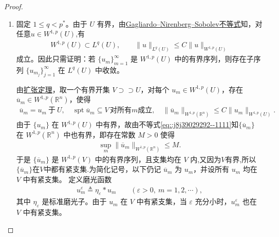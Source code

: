\documentclass[../../main.tex]{subfiles}
\begin{document}
\begin{proof}
\begin{enumerate}[(1)]
\item 固定 $1\leqslant q<p^{*}$。由于 $U$ 有界，由\hyperref[theorem:Gagliardo--Nirenberg--Sobolev不等式]{Gagliardo--Nirenberg--Sobolev不等式}知，对任意$u\in W^{1,p}(U)$,有
\begin{align}\label{eq::rellich-continuous}
W^{1,p}(U)\subset L^{q}(U),\qquad \|u\|_{L^{q}(U)}\leqslant C\|u\|_{W^{1,p}(U)}
\end{align}
成立。因此只需证明：若 $\{u_{m}\}_{m=1}^{\infty}$ 是 $W^{1,p}(U)$ 中的有界序列，则存在子序列 $\{u_{m_{j}}\}_{j=1}^{\infty}$ 在 $L^{q}(U)$ 中收敛。

由\hyperref[theorem:ch05-扩张定理]{扩张定理}，取一个有界开集 $V\supset \supset U$，对每个 $u_{m}\in W^{1,p}(U)$，存在 $\overline{u}_{m}\in W^{1,p}(\mathbb{R}^{n})$，使得
\begin{align}\label{eq::j8j39029292--1111}
\overline{u}_{m}=u_{m}\ \text{于}\ U,\quad \operatorname{spt}\overline{u}_{m}\subseteq V\,\text{对所有} m \text{成立},\quad
\|\overline{u}_{m}\|_{W^{1,p}(\mathbb{R}^{n})}\leqslant C\|u_{m}\|_{W^{1,p}(U)}.
\end{align}
由于 $\{u_{m}\}$ 在 $W^{1,p}(U)$ 中有界，故由不等式\eqref{eq::j8j39029292--1111}知$\{\overline{u}_{m}\}$ 在 $W^{1,p}(\mathbb{R}^{n})$ 中也有界，即存在常数 $M>0$ 使得
\begin{align}\label{eq::jijiMMJiojio2}
\sup_{m}\|\overline{u}_{m}\|_{W^{1,p}(\mathbb{R}^{n})}\leqslant M.
\end{align}
于是 $\{\overline{u}_{m}\}$ 是 $W^{1,p}(V)$ 中的有界序列，且支集均在 $V$ 内,又因为$V$有界,所以$\{\overline{u}_{m}\}$在$V$中都有紧支集.为简化记号，以下仍记 $\overline{u}_{m}$ 为 $u_{m}$，并设所有 $u_{m}$ 均在 $V$ 中有紧支集。
定义磨光函数
\begin{align*}
u_{m}^{\varepsilon}\triangleq\eta_{\varepsilon}*u_{m}\qquad (\varepsilon>0,\ m=1,2,\cdots),
\end{align*}
其中 $\eta_{\varepsilon}$ 是标准磨光子。由于 $u_{m}$ 在 $V$ 中有紧支集，当 $\varepsilon$ 充分小时，$u_{m}^{\varepsilon}$ 也在 $V$ 中有紧支集。


\end{enumerate}
\end{proof}
\end{document}
